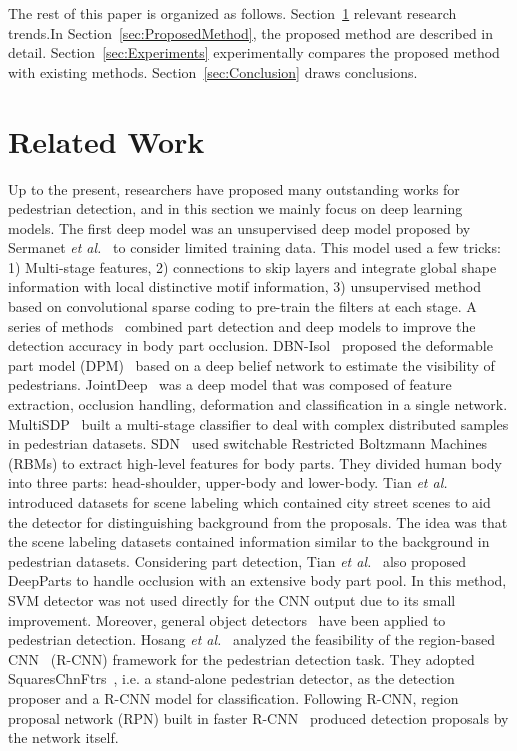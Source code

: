 \documentclass[journal]{IEEEtran}
\begin{document}
The rest of this paper is organized as follows.
Section~\ref{sec:RelatedWorks} relevant research trends.In Section~\ref{sec:ProposedMethod}, the proposed method are described in detail. Section~\ref{sec:Experiments} experimentally compares the proposed method with existing methods. Section~\ref{sec:Conclusion} draws conclusions.


\section{Related Work}
\label{sec:RelatedWorks}
Up to the present, researchers have proposed many outstanding works for pedestrian detection, and in this section we mainly focus on deep learning models. The first deep model was an unsupervised deep model proposed by Sermanet \emph{et al.}~\cite{sermanet2013pedestrian} to consider limited training data. This model used a few tricks: 1) Multi-stage features, 2) connections to skip layers and integrate global shape information with local distinctive motif information, 3) unsupervised method based on convolutional sparse coding to pre-train the filters at each stage. A series of methods~\cite{ouyang2012discriminative, ouyang2013joint, ouyang2013modeling, luo2014switchable} combined part detection and deep models to improve the detection accuracy in body part occlusion. DBN-Isol~\cite{ouyang2012discriminative} proposed the deformable part model (DPM)~\cite{felzenszwalb2010object} based on a deep belief network to estimate the visibility of pedestrians. JointDeep~\cite{ouyang2013joint} was a deep model that was composed of feature extraction, occlusion handling, deformation and classification in a single network. MultiSDP~\cite{zeng2013multi} built a multi-stage classifier to deal with complex distributed samples in pedestrian datasets. SDN~\cite{luo2014switchable} used switchable Restricted Boltzmann Machines (RBMs) to extract high-level features for body parts. They divided human body into three parts: head-shoulder, upper-body and lower-body.
Tian \emph{et al.}~\cite{tian2015pedestrian} introduced datasets for scene labeling which contained city street scenes to aid the detector for distinguishing background from the proposals. The idea was that the scene labeling datasets contained information similar to the background in pedestrian datasets. Considering part detection, Tian \emph{et al.}~\cite{tian2015deep} also proposed DeepParts to handle occlusion with an extensive body part pool. In this method, SVM detector was not used directly for the CNN output due to its small improvement. Moreover, general object detectors~\cite{girshick2014rich} have been applied to pedestrian detection. Hosang \emph{et al.}~\cite{hosang2015taking} analyzed the feasibility of the region-based CNN~\cite{girshick2014rich} (R-CNN) framework for the pedestrian detection task. They adopted SquaresChnFtrs~\cite{benenson2013seeking}, i.e. a stand-alone pedestrian detector, as the detection proposer and a R-CNN model for classification. Following R-CNN, region proposal network (RPN) built in faster R-CNN~\cite{ren2015faster} produced detection proposals by the network itself.
\end{document}
